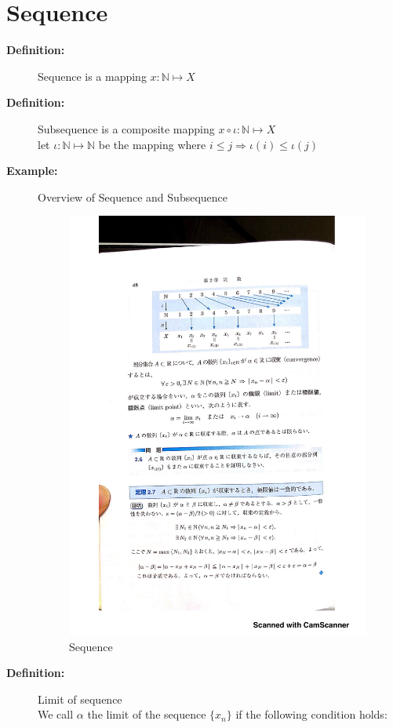 \documentclass[english,dvipdfmx]{jsarticle}
\begin{document}
\section{Sequence}
    \begin{description}
        \item[\bf{Definition:}] Sequence is a mapping $ x : \mathbb{N} \longmapsto X $
        \item[\bf{Definition:}] Subsequence is a composite mapping $ x \circ \iota : \mathbb{N} \longmapsto X$ \\
        let $\iota : \mathbb{N} \longmapsto \mathbb{N} $ be the mapping where $ i \leq j \Rightarrow \iota(i) \leq \iota(j) $
        \item[\bf{Example:}] Overview of Sequence and Subsequence 
            \begin{figure}[H]
                \begin{center}
                \includegraphics[clip,width=10cm]{./sequence.pdf}
                \caption{Sequence}
                \end{center}
            \end{figure}
        \item[\bf{Definition:}] Limit of sequence \\
            We call $\alpha$ the limit of the sequence $\{ x_n \}$ if the following condition holds:

\end{description}
\end{document}

